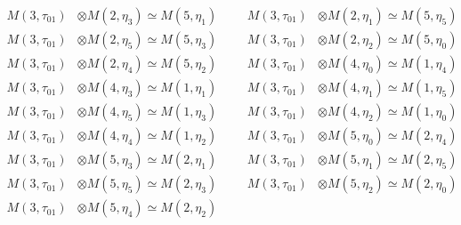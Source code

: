 \begin{align*}
M(3,\tau_{01}) &\otimes M(2,\eta_{3}) \simeq M(5,\eta_{1}) &&& M(3,\tau_{01}) &\otimes M(2,\eta_{1}) \simeq M(5,\eta_{5})\\
M(3,\tau_{01}) &\otimes M(2,\eta_{5}) \simeq M(5,\eta_{3}) &&& M(3,\tau_{01}) &\otimes M(2,\eta_{2}) \simeq M(5,\eta_{0})\\
M(3,\tau_{01}) &\otimes M(2,\eta_{4}) \simeq M(5,\eta_{2}) &&& M(3,\tau_{01}) &\otimes M(4,\eta_{0}) \simeq M(1,\eta_{4})\\
M(3,\tau_{01}) &\otimes M(4,\eta_{3}) \simeq M(1,\eta_{1}) &&& M(3,\tau_{01}) &\otimes M(4,\eta_{1}) \simeq M(1,\eta_{5})\\
M(3,\tau_{01}) &\otimes M(4,\eta_{5}) \simeq M(1,\eta_{3}) &&& M(3,\tau_{01}) &\otimes M(4,\eta_{2}) \simeq M(1,\eta_{0})\\
M(3,\tau_{01}) &\otimes M(4,\eta_{4}) \simeq M(1,\eta_{2}) &&& M(3,\tau_{01}) &\otimes M(5,\eta_{0}) \simeq M(2,\eta_{4})\\
M(3,\tau_{01}) &\otimes M(5,\eta_{3}) \simeq M(2,\eta_{1}) &&& M(3,\tau_{01}) &\otimes M(5,\eta_{1}) \simeq M(2,\eta_{5})\\
M(3,\tau_{01}) &\otimes M(5,\eta_{5}) \simeq M(2,\eta_{3}) &&& M(3,\tau_{01}) &\otimes M(5,\eta_{2}) \simeq M(2,\eta_{0})\\
M(3,\tau_{01}) &\otimes M(5,\eta_{4}) \simeq M(2,\eta_{2})
\end{align*}

